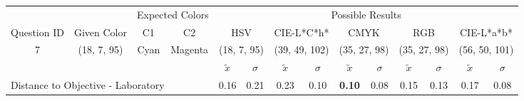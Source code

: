 \begin{table}[H]
  \resizebox{\textwidth}{!} {
  \begin{tabular}{lccccccccccccc}
    \hline
    \multicolumn{1}{c}{}                              &                                      & \multicolumn{2}{c}{Expected Colors}                   & \multicolumn{10}{c}{Possible Results}                                                                                                                                                                                                                                                                                        \\ \cline{3-14}
    \multicolumn{1}{c}{\multirow{-2}{*}{Question ID}} & \multirow{-2}{*}{Given Color}        & C1                       & C2                         & \multicolumn{2}{c}{HSV}                                        & \multicolumn{2}{c}{CIE-L*C*h*}                                 & \multicolumn{2}{c}{CMYK}                                       & \multicolumn{2}{c}{RGB}                                        & \multicolumn{2}{c}{CIE-L*a*b*}                                 \\ \hline
    \multicolumn{1}{c}{7}                             & \cellcolor[HTML]{0000FF}(18, 7, 95) & \multicolumn{1}{c|}{Cyan} & \multicolumn{1}{c|}{Magenta}  & \multicolumn{2}{c|}{\cellcolor[HTML]{0000FF}(18, 7, 95)}      & \multicolumn{2}{c|}{\cellcolor[HTML]{00CAFF}(39, 49, 102)}       & \multicolumn{2}{c|}{\cellcolor[HTML]{8080FF}(35, 27, 98)}       & \multicolumn{2}{c|}{\cellcolor[HTML]{8080FF}(35, 27, 98)}       & \multicolumn{2}{c|}{\cellcolor[HTML]{C6AEFF}(56, 50, 101)}       \\ \hline
                                                      & \multicolumn{1}{l}{}                 & \multicolumn{1}{l}{}     & \multicolumn{1}{l}{}       & \multicolumn{1}{c}{$\tilde{x}$} & \multicolumn{1}{c}{$\sigma$} & \multicolumn{1}{c}{$\tilde{x}$} & \multicolumn{1}{c}{$\sigma$} & \multicolumn{1}{c}{$\tilde{x}$} & \multicolumn{1}{c}{$\sigma$} & \multicolumn{1}{c}{$\tilde{x}$} & \multicolumn{1}{c}{$\sigma$} & \multicolumn{1}{c}{$\tilde{x}$} & \multicolumn{1}{c}{$\sigma$} \\ \hline
    \multicolumn{4}{l}{Distance to Objective - Laboratory}                                                                                           & \multicolumn{1}{|c}{0.16}       & \multicolumn{1}{c|}{0.21}    & \multicolumn{1}{|c}{0.23}       & \multicolumn{1}{c|}{0.10}    & \multicolumn{1}{|c}{\textbf{0.10}}       & \multicolumn{1}{c|}{0.08}    & \multicolumn{1}{|c}{0.15}       & \multicolumn{1}{c|}{0.13}    & \multicolumn{1}{|c}{0.17}       & \multicolumn{1}{c|}{0.08}    \\

\end{tabular}}
\end{table}
